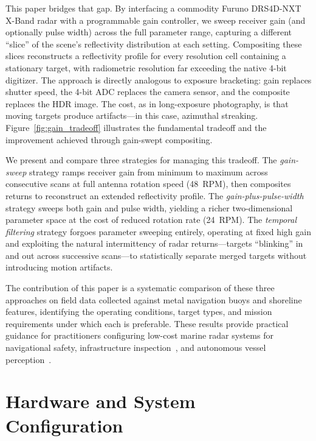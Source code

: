 \documentclass[colorlinks,upint,balance]{asmeconf}
\begin{document}
This paper bridges that gap. By interfacing a commodity Furuno DRS4D-NXT X-Band radar with a programmable gain controller, we sweep receiver gain (and optionally pulse width) across the full parameter range, capturing a different ``slice'' of the scene's reflectivity distribution at each setting. Compositing these slices reconstructs a reflectivity profile for every resolution cell containing a stationary target, with radiometric resolution far exceeding the native 4-bit digitizer. The approach is directly analogous to exposure bracketing: gain replaces shutter speed, the 4-bit ADC replaces the camera sensor, and the composite replaces the HDR image. The cost, as in long-exposure photography, is that moving targets produce artifacts---in this case, azimuthal streaking. Figure~\ref{fig:gain_tradeoff} illustrates the fundamental tradeoff and the improvement achieved through gain-swept compositing.

We present and compare three strategies for managing this tradeoff. The \textit{gain-sweep} strategy ramps receiver gain from minimum to maximum across consecutive scans at full antenna rotation speed (48~RPM), then composites returns to reconstruct an extended reflectivity profile. The \textit{gain-plus-pulse-width} strategy sweeps both gain and pulse width, yielding a richer two-dimensional parameter space at the cost of reduced rotation rate (24~RPM). The \textit{temporal filtering} strategy forgoes parameter sweeping entirely, operating at fixed high gain and exploiting the natural intermittency of radar returns---targets ``blinking'' in and out across successive scans---to statistically separate merged targets without introducing motion artifacts.

The contribution of this paper is a systematic comparison of these three approaches on field data collected against metal navigation buoys and shoreline features, identifying the operating conditions, target types, and mission requirements under which each is preferable. These results provide practical guidance for practitioners configuring low-cost marine radar systems for navigational safety, infrastructure inspection~\cite{Negi2024SHM}, and autonomous vessel perception~\cite{Han2020ARAGON}.


\section{Hardware and System Configuration}
\end{document}
